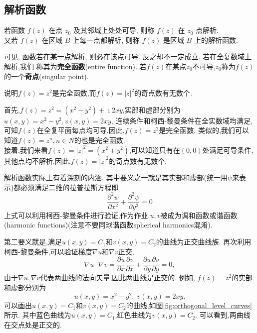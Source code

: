 \subsection{解析函数}
\begin{definition}
若函数 $f(z)$ 在点 $z_0$ 及其邻域上处处可导, 则称 $f(z)$ 在 $z_0$ 点解析.\\
 又若 $f(z)$ 在区域 $B$ 上每一点都解析, 则称 $f(z)$ 是区域 $B$ 上的解析函数.
\end{definition} 
 可见, 函数若在某一点解析, 则必在该点可导. 反之却不一定成立. 若在全复数域上解析,我们
 称其为{\bf 完全函数}(entire function).
 若$f(z)$在某点$z_0$不可导,$z_0$称为$f(z)$的一个{\bf 奇点}(singular point).

 \begin{example}
说明$f(z)=z^2$是完全函数,而$f(z)=|z|^2$的奇点数有无数个.
\end{example}
\begin{solution}
    首先,$f(z) =z^2 = (x^2 - y ^2) + \imath 2 x y$,实部和虚部分别为$u(x,y) = x^2 - y^2, v(x,y)=2x y$,
连续条件和柯西-黎曼条件在全实数域均满足,可知$f(z)$在全复平面每点均可导.因此,$f(z)=z^2$是完全函数.
类似的,我们可以知道$f(z)=z^n, n\in N$的也是完全函数.\\
    接着,我们来看$f(z) = |z|^2 = (x^2 + y ^2)$,可以知道只有在$(0,0)$处满足可导条件,其他点均不解析.因此,$f(z)=|z|^2$的奇点数有无数个.
 \end{solution}

 解析函数实际上有着深刻的内涵. 其中要义之一就是其实部和虚部(统一用$\psi$来表示)都必须满足二维的拉普拉斯方程即
 \begin{equation}
    \label{eq:Laplace_eq}
    \frac{\partial^2 \psi}{\partial x^2}+\frac{\partial^2 \psi}{\partial y^2}=0
 \end{equation}
上式可以利用柯西-黎曼条件进行验证,作为作业.$u,v$被成为调和函数或谐函数(harmonic functions)(注意不要同球谐函数spherical harmonics混淆).

第二要义就是,满足$u(x,y) = C_1$和$v(x,y)= C_2$的曲线为正交曲线族.
再次利用柯西-黎曼条件,可以验证梯度$\nabla u $和$\nabla v$正交,
\begin{equation}
    \nabla u \cdot \nabla v = \frac{\partial u}{\partial x} 
    \frac{\partial v}{\partial x}+\frac{\partial u}{\partial y} \frac{\partial v}{\partial y}=0 ,
\end{equation}
由于$\nabla u, \nabla v$代表两曲线的法向矢量,因此两曲线是正交的. 例如, $f(z) = z^2$的实部和虚部分别为
\begin{equation}
    u(x,y) = x^2 - y^2, \; v(x,y) = 2xy .
\end{equation}
可以画出$u(x,y) = C_1$和$v(x,y)= C_2$的曲线,如图\ref{fig:orthogonal_level_curves}所示. 
其中蓝色曲线为$u(x,y) = C_1$,红色曲线为$v(x,y)=C_2$. 可以看到,两曲线在交点处是正交的.

